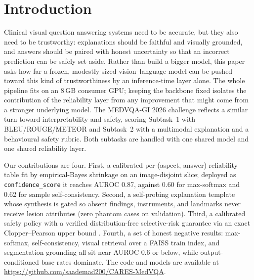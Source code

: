 \documentclass{ceurart}
\begin{document}
\maketitle

\section{Introduction}

Clinical visual question answering systems need to be accurate, but
they also need to be trustworthy: explanations should be faithful
and visually grounded, and answers should be paired with honest
uncertainty so that an incorrect prediction can be safely set aside.
Rather than build a bigger model, this paper asks how far a frozen,
modestly-sized vision--language model can be pushed toward this kind
of trustworthiness by an inference-time layer alone. The whole
pipeline fits on an 8\,GB consumer GPU; keeping the backbone fixed
isolates the contribution of the reliability layer from any
improvement that might come from a stronger underlying model. The MEDVQA-GI 2026 challenge \cite{medico2026,ImageCLEF2026} reflects a similar turn
toward interpretability and safety, scoring Subtask~1 with
BLEU/ROUGE/METEOR and Subtask~2 with a multimodal explanation and a
behavioural safety rubric. Both subtasks are handled with one
shared model and one shared reliability layer.

Our contributions are four. First, a calibrated per-(aspect, answer)
reliability table fit by empirical-Bayes shrinkage on an
image-disjoint slice; deployed as \texttt{confidence\_score} it
reaches AUROC 0.87, against 0.60 for max-softmax and 0.62 for
sample self-consistency. Second, a self-probing explanation template
whose synthesis is gated so absent findings, instruments, and
landmarks never receive lesion attributes (zero phantom cases on
validation). Third, a calibrated safety policy with a verified
distribution-free selective-risk guarantee via an exact
Clopper--Pearson upper bound \cite{bates2021distribution}. Fourth, a
set of honest negative results: max-softmax, self-consistency,
visual retrieval over a FAISS train index, and segmentation grounding
all sit near AUROC 0.6 or below, while output-conditioned base rates
dominate. The code and models are available at \url{https://github.com/saademad200/CARES-MedVQA}.
\end{document}
